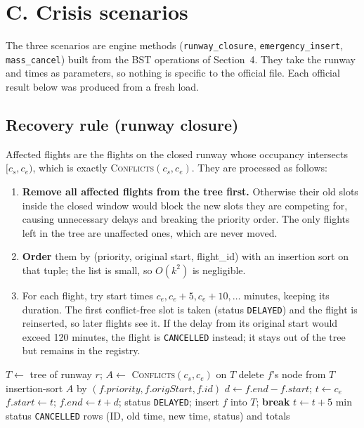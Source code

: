 \documentclass[11pt]{article}
\begin{document}
\section{C. Crisis scenarios}

The three scenarios are engine methods
(\texttt{runway\_closure}, \texttt{emergency\_insert},
\texttt{mass\_cancel}) built from the BST operations of Section~4. They take
the runway and times as parameters, so nothing is specific to the official
file. Each official result below was produced from a fresh load.

\subsection{Recovery rule (runway closure)}
Affected flights are the flights on the closed runway whose occupancy
intersects $[c_s, c_e)$, which is exactly \textsc{Conflicts}$(c_s, c_e)$. They
are processed as follows:

\begin{enumerate}
  \item \textbf{Remove all affected flights from the tree first.} Otherwise
  their old slots inside the closed window would block the new slots they are
  competing for, causing unnecessary delays and breaking the priority order.
  The only flights left in the tree are unaffected ones, which are never moved.
  \item \textbf{Order} them by (priority, original start, flight\_id) with an
  insertion sort on that tuple; the list is small, so $O(k^2)$ is negligible.
  \item For each flight, try start times $c_e, c_e+5, c_e+10, \dots$ minutes,
  keeping its duration. The first conflict-free slot is taken (status
  \texttt{DELAYED}) and the flight is reinserted, so later flights see it. If
  the delay from its original start would exceed 120 minutes, the flight is
  \texttt{CANCELLED} instead; it stays out of the tree but remains in the
  registry.
\end{enumerate}

\begin{algorithm}[ht]
\caption{Runway closure (matches \texttt{Engine.runway\_closure})}
\begin{algorithmic}[1]
  \State $T \gets$ tree of runway $r$; \quad $A \gets$ \textsc{Conflicts}$(c_s, c_e)$ on $T$
   \State delete $f$'s node from $T$ \EndFor
  \State insertion-sort $A$ by $(f.\mathit{priority}, f.\mathit{origStart}, f.\mathit{id})$
    \State $d \gets f.\mathit{end} - f.\mathit{start}$; \quad $t \gets c_e$
        \State $f.\mathit{start} \gets t$; $f.\mathit{end} \gets t+d$; status \texttt{DELAYED};
        insert $f$ into $T$; \textbf{break}
      \EndIf
      \State $t \gets t + 5$ min
    \EndWhile
     status \texttt{CANCELLED} \EndIf
  \EndFor
  \State \Return rows (ID, old time, new time, status) and totals
\EndProcedure
\end{algorithmic}
\end{algorithm}
\end{document}
